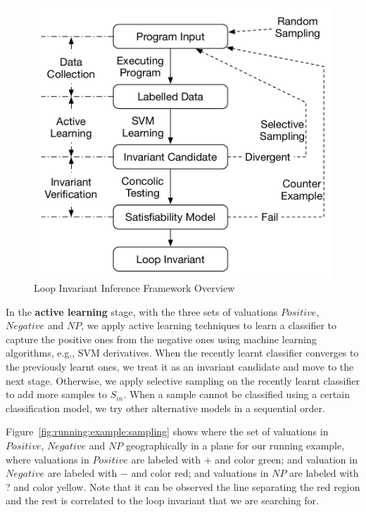 \begin{figure}[t]
    \centering
    \includegraphics[scale=0.45]{figures/overview.pdf}
    \caption{Loop Invariant Inference Framework Overview}
    \label{fig:overview}
\end{figure}

In the \textbf{active learning} stage, with the three sets of valuations $Positive$, $Negative$ and $NP$, we apply active learning techniques to learn a classifier to capture the positive ones from the negative ones
    using machine learning algorithms, e.g., SVM derivatives.
    When the recently learnt classifier converges to the previously learnt ones,
    we treat it as an invariant candidate and move to the next stage.
    Otherwise, we apply selective sampling on the recently learnt classifier
    to add more samples to $S_{\mathit{in}}$.
    When a sample cannot be classified using a certain classification model,
    we try other alternative models in a sequential order.

Figure~\ref{fig:running:example:sampling} shows where the set of valuations in $Positive$, $Negative$ and $NP$ geographically in a plane for our running example, where valuations in $Positive$ are labeled with $+$ and color green; and valuation in $Negative$ are labeled with $-$ and color red; and valuations in $NP$ are labeled with ? and color yellow. Note that it can be observed the line separating the red region and the rest is correlated to the loop invariant that we are searching for.



